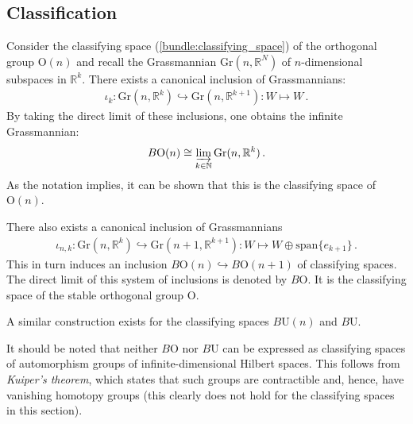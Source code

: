 \subsection{Classification}

    \begin{property}
        Consider the classifying space (\cref{bundle:classifying_space}) of the orthogonal group $\mathrm{O}(n)$ and recall the Grassmannian $\mathrm{Gr}(n,\mathbb{R}^N)$ of $n$-dimensional subspaces in $\mathbb{R}^k$. There exists a canonical inclusion of Grassmannians:
        \begin{gather}
            \iota_k:\mathrm{Gr}(n,\mathbb{R}^k)\hookrightarrow\mathrm{Gr}(n,\mathbb{R}^{k+1}):W\mapsto W\,.
        \end{gather}
        By taking the direct limit of these inclusions, one obtains the infinite Grassmannian:
        \begin{gather}
            B\mathrm{O}(n) \cong \varinjlim_{k\in\mathbb{N}}\mathrm{Gr}(n,\mathbb{R}^k)\,.
        \end{gather}
        As the notation implies, it can be shown that this is the classifying space of $\mathrm{O}(n)$.

        There also exists a canonical inclusion of Grassmannians
        \begin{gather}
            \iota_{n,k}:\mathrm{Gr}(n,\mathbb{R}^k)\hookrightarrow \mathrm{Gr}(n+1,\mathbb{R}^{k+1}):W\mapsto W\oplus\mathrm{span}\{e_{k+1}\}\,.
        \end{gather}
        This in turn induces an inclusion $B\mathrm{O}(n)\hookrightarrow B\mathrm{O}(n+1)$ of classifying spaces. The direct limit of this system of inclusions is denoted by $B\mathrm{O}$. It is the classifying space of the stable orthogonal group $\mathrm{O}$.
    \end{property}
    \begin{remark}
        A similar construction exists for the classifying spaces $B\mathrm{U}(n)$ and $B\mathrm{U}$.
    \end{remark}
    \begin{remark}\label{k:kuiper_remark}
        It should be noted that neither $B\mathrm{O}$ nor $B\mathrm{U}$ can be expressed as classifying spaces of automorphism groups of infinite-dimensional Hilbert spaces. This follows from \textit{Kuiper's theorem}, which states that such groups are contractible and, hence, have vanishing homotopy groups (this clearly does not hold for the classifying spaces in this section).
    \end{remark}


